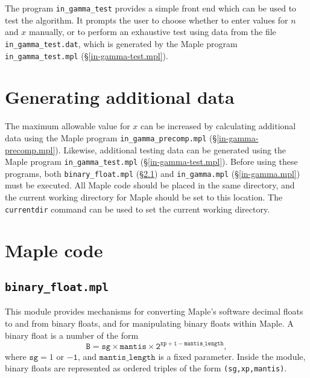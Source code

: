 \documentclass[paper=a4,smallheadings]{scrartcl}
\begin{document}
The program \texttt{in\_gamma\_test} provides a simple front end which
can be used to test the algorithm. It prompts the user to choose
whether to enter values for $n$ and $x$ manually, or to perform an
exhaustive test using data from the file \texttt{in\_gamma\_test.dat},
which is generated by the Maple program \texttt{in\_gamma\_test.mpl}
(\S\ref{in-gamma-test.mpl}).
%
\section{Generating additional data}
\label{sec:additional}
The maximum allowable value for $x$ can be increased by calculating
additional data using the Maple program \texttt{in\_gamma\_precomp.mpl}
(\S\ref{in-gamma-precomp.mpl}).  Likewise, additional testing data can
be generated using the Maple program \texttt{in\_gamma\_test.mpl}
(\S\ref{in-gamma-test.mpl}).  Before using these programs, both
\texttt{binary\_float.mpl} (\S\ref{binary-float.mpl}) and
\texttt{in\_gamma.mpl} (\S\ref{in-gamma.mpl}) must be executed.
All Maple code should be placed in the same directory, and the current 
working directory for Maple should be set to this location. The 
\texttt{currentdir} command can be used to set the current working
directory.
%
\section{Maple code}
\subsection{\texttt{binary\_float.mpl}}
\label{binary-float.mpl}
This module provides mechanisms for converting Maple's software
decimal floats to and from binary floats, and for manipulating binary
floats within Maple. A binary float is a number of the form
\begin{equation}\label{def:bfloat}
\mathtt{B=sg \times mantis \times 2^{xp+1-mantis\_length}},
\end{equation}
where $\mathtt{sg}=1$ or $\mathtt{-1}$, and $\mathtt{mantis\_length}$ is a
fixed parameter. Inside the module, binary floats are represented as ordered
triples of the form \texttt{(sg,xp,mantis)}.
%
\end{document}

